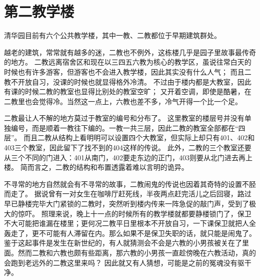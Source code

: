 \chapter{第二教学楼}


清华园目前有六个公共教学楼，其中一教、二教都位于早期建筑群处。


越老的建筑，常常就有越多的迷，二教也不例外，这栋楼几乎是园子里故事最传奇的地方。
二教远离宿舍区和现在以三四五六教为核心的教学区，虽说往常白天的时候也有许多游客，但游客也不会进入教学楼，因此其实没有什么人气；
而且二教不开放自习，没课的时候也就显得格外冷清。
不过由于楼内都是大教室，因此有课的时候二教的教室也显得比别处的教室空旷；
又开着空调，即使是酷暑，在二教里也会觉得冷。当然这一点上，六教也差不多，冷气开得一个比一个足。

二教最让人不解的地方莫过于教室的编号和分布了。
这里教室的楼层号并没有单独编号，而是顺着一教往下编的。一教一共三层，因此二教的教室全部都在“四层”。
而且二教从结构上看明明可以设置四个大教室，但实际上却只有401、402和403三个教室，因此留下了找不到的404这样的传说。
此外，二教的三个教室还要从三个不同的门进入：401从南门，402要走东边的正门，403则要从北门进去再上楼。
简而言之，二教的结构和布置透露着难以言明的诡异。

不寻常的地方自然就会有不寻常的故事，二教闹鬼的传说也因着其奇特的设置不胫而走了。
据说曾有一对女生在咖啡厅赶死线，半夜两点赶完活儿之后回寝，路过早已静楼完毕大门紧锁的二教时，突然听到楼内传来一阵急促的敲门声，受到了极大的惊吓。
照理来说，晚上十一点的时候所有的教学楼就都要静楼锁门了，保卫不大可能把谁漏在楼里；更何况二教平日里根本不开放自习，一下课保卫就把人全轰走了，更不可能有人滞留在内。那么如果不是保卫失职的话，就只能是闹鬼了。
鉴于这起事件是发生在新世纪的，有人就猜测会不会是六教的小男孩被关在了里面。然而二教和六教也颇有些距离，那六教的小男孩一直趁傍晚在六教活动，真的会跑到老远外的二教这里来吗？
因此就又有人猜想，可能是之前的冤魂没有驱干净。

